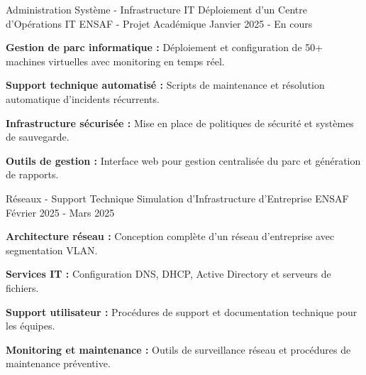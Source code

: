 
\begin{cventries}

  \cventry
  {Administration Système - Infrastructure IT}
  {Déploiement d'un Centre d'Opérations IT} %
  {ENSAF - Projet Académique} %
  {Janvier 2025 - En cours} %
  {
    \begin{cvitems} %
      \item {
                  \textbf{Gestion de parc informatique :}
                  Déploiement et configuration de 50+ machines virtuelles avec monitoring en temps réel.}
      \item {
                  \textbf{Support technique automatisé :}
                  Scripts de maintenance et résolution automatique d'incidents récurrents.}
      \item {
                  \textbf{Infrastructure sécurisée :}
                  Mise en place de politiques de sécurité et systèmes de sauvegarde.}
      \item {
                  \textbf{Outils de gestion :}
                  Interface web pour gestion centralisée du parc et génération de rapports.}
    \end{cvitems}
  }

  \cventry
  {Réseaux - Support Technique}
  {Simulation d'Infrastructure d'Entreprise} %
  {ENSAF} %
  {Février 2025 - Mars 2025} %
  {
    \begin{cvitems} %
      \item {
                  \textbf{Architecture réseau :}
                  Conception complète d'un réseau d'entreprise avec segmentation VLAN.}
      \item {
                  \textbf{Services IT :}
                  Configuration DNS, DHCP, Active Directory et serveurs de fichiers.}
      \item {
                  \textbf{Support utilisateur :}
                  Procédures de support et documentation technique pour les équipes.}
      \item {
                  \textbf{Monitoring et maintenance :}
                  Outils de surveillance réseau et procédures de maintenance préventive.}
    \end{cvitems}
  }

\end{cventries}